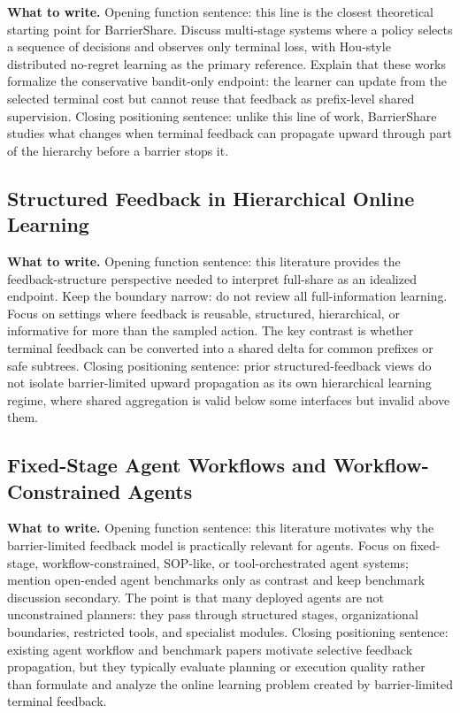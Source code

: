 \documentclass{article}
\newcommand{\towrite}[1]{\noindent\textbf{What to write.} #1}
\begin{document}
\towrite{Opening function sentence: this line is the closest theoretical starting point for BarrierShare. Discuss multi-stage systems where a policy selects a sequence of decisions and observes only terminal loss, with Hou-style distributed no-regret learning as the primary reference. Explain that these works formalize the conservative bandit-only endpoint: the learner can update from the selected terminal cost but cannot reuse that feedback as prefix-level shared supervision. Closing positioning sentence: unlike this line of work, BarrierShare studies what changes when terminal feedback can propagate upward through part of the hierarchy before a barrier stops it.}

\subsection{Structured Feedback in Hierarchical Online Learning}

\towrite{Opening function sentence: this literature provides the feedback-structure perspective needed to interpret full-share as an idealized endpoint. Keep the boundary narrow: do not review all full-information learning. Focus on settings where feedback is reusable, structured, hierarchical, or informative for more than the sampled action. The key contrast is whether terminal feedback can be converted into a shared delta for common prefixes or safe subtrees. Closing positioning sentence: prior structured-feedback views do not isolate barrier-limited upward propagation as its own hierarchical learning regime, where shared aggregation is valid below some interfaces but invalid above them.}

\subsection{Fixed-Stage Agent Workflows and Workflow-Constrained Agents}

\towrite{Opening function sentence: this literature motivates why the barrier-limited feedback model is practically relevant for agents. Focus on fixed-stage, workflow-constrained, SOP-like, or tool-orchestrated agent systems; mention open-ended agent benchmarks only as contrast and keep benchmark discussion secondary. The point is that many deployed agents are not unconstrained planners: they pass through structured stages, organizational boundaries, restricted tools, and specialist modules. Closing positioning sentence: existing agent workflow and benchmark papers motivate selective feedback propagation, but they typically evaluate planning or execution quality rather than formulate and analyze the online learning problem created by barrier-limited terminal feedback.}
\end{document}
